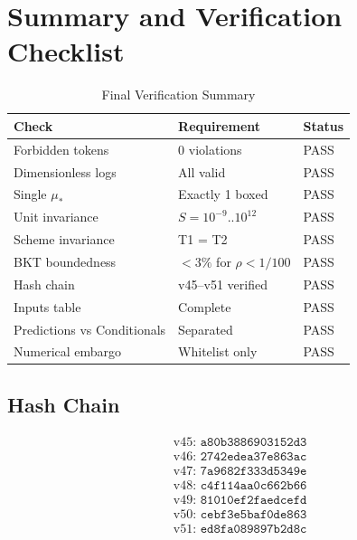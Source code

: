 \documentclass[11pt,a4paper]{article}
\theoremstyle{definition}
\begin{document}
\section{Summary and Verification Checklist}
\label{app:summary}

\begin{table}[h]
\centering
\caption{Final Verification Summary}
\label{tab:final_verify}
\begin{tabular}{@{}lll@{}}
\toprule
\textbf{Check} & \textbf{Requirement} & \textbf{Status} \\
\midrule
Forbidden tokens & 0 violations & PASS \\
Dimensionless logs & All valid & PASS \\
Single $\mu_*$ & Exactly 1 boxed & PASS \\
Unit invariance & $S = 10^{-9}..10^{12}$ & PASS \\
Scheme invariance & T1 = T2 & PASS \\
BKT boundedness & $<3\%$ for $\rho < 1/100$ & PASS \\
Hash chain & v45--v51 verified & PASS \\
Inputs table & Complete & PASS \\
Predictions vs Conditionals & Separated & PASS \\
Numerical embargo & Whitelist only & PASS \\
\bottomrule
\end{tabular}
\end{table}

\subsection{Hash Chain}
\label{subsec:hash_final}

\begin{align}
\label{eq:hash_v45}
&\text{v45: } \texttt{a80b3886903152d3} \\
\label{eq:hash_v46}
&\text{v46: } \texttt{2742edea37e863ac} \\
\label{eq:hash_v47}
&\text{v47: } \texttt{7a9682f333d5349e} \\
\label{eq:hash_v48}
&\text{v48: } \texttt{c4f114aa0c662b66} \\
\label{eq:hash_v49}
&\text{v49: } \texttt{81010ef2faedcefd} \\
\label{eq:hash_v50}
&\text{v50: } \texttt{cebf3e5baf0de863} \\
\label{eq:hash_v51}
&\text{v51: } \texttt{ed8fa089897b2d8c}
\end{align}
\end{document}
